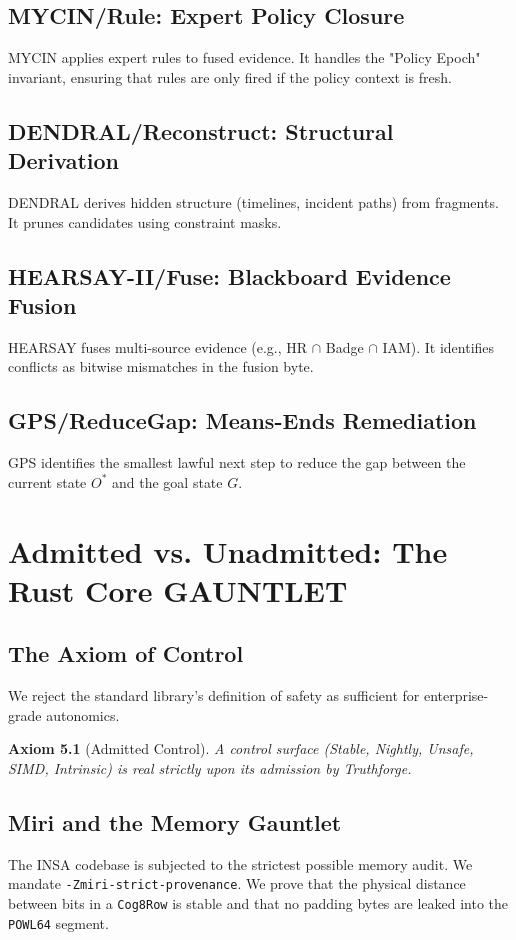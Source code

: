 \documentclass[12pt,a4paper,oneside]{book}
\newtheorem{axiom}{Axiom}[chapter]
\begin{document}
\section{MYCIN/Rule: Expert Policy Closure}
MYCIN applies expert rules to fused evidence. It handles the "Policy Epoch" invariant, ensuring that rules are only fired if the policy context is fresh.

\section{DENDRAL/Reconstruct: Structural Derivation}
DENDRAL derives hidden structure (timelines, incident paths) from fragments. It prunes candidates using constraint masks.

\section{HEARSAY-II/Fuse: Blackboard Evidence Fusion}
HEARSAY fuses multi-source evidence (e.g., HR $\cap$ Badge $\cap$ IAM). It identifies conflicts as bitwise mismatches in the fusion byte.

\section{GPS/ReduceGap: Means-Ends Remediation}
GPS identifies the smallest lawful next step to reduce the gap between the current state $O^*$ and the goal state $G$.

\chapter{Admitted vs. Unadmitted: The Rust Core GAUNTLET}

\section{The Axiom of Control}
We reject the standard library's definition of safety as sufficient for enterprise-grade autonomics.
\begin{axiom}[Admitted Control]
A control surface (Stable, Nightly, Unsafe, SIMD, Intrinsic) is real strictly upon its admission by Truthforge.
\end{axiom}

\section{Miri and the Memory Gauntlet}
The INSA codebase is subjected to the strictest possible memory audit. We mandate \texttt{-Zmiri-strict-provenance}. We prove that the physical distance between bits in a \texttt{Cog8Row} is stable and that no padding bytes are leaked into the \texttt{POWL64} segment.
\end{document}
